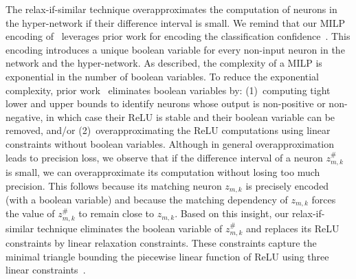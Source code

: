 The relax-if-similar technique overapproximates the computation of neurons in the hyper-network if their difference interval is small. 
We remind that our MILP encoding of~ leverages prior work for encoding the classification confidence~\cite{ref_42}.
This encoding introduces a unique boolean variable for every non-input neuron in the network and the hyper-network.
As described, the complexity of a MILP is exponential in the number of boolean variables. 
 To reduce the exponential complexity, prior work~\cite{ref_49,ref_7,ref_5,ref_6,ref_50} eliminates boolean variables by: 
 (1)~computing tight lower and upper bounds to identify neurons whose output is non-positive or non-negative, in which case their ReLU is stable and their boolean variable can be removed, and/or 
(2)~overapproximating the ReLU computations using linear constraints without boolean variables. 
Although in general overapproximation leads to precision loss, we observe that if the difference interval of a neuron $z_{m,k}^\#$ is small, we can overapproximate its computation without losing too much precision. This follows because its matching neuron $z_{m,k}$ is precisely encoded (with a boolean variable) and because the matching dependency of $z_{m,k}$ forces the value of $z^\#_{m,k}$ to remain close to $z_{m,k}$. 
Based on this insight, our relax-if-similar technique 
eliminates the boolean variable of $z_{m,k}^\#$ and replaces its ReLU constraints by linear relaxation constraints.
These constraints capture the minimal triangle bounding
the piecewise linear function of ReLU 
using three linear constraints~\cite{Ehlers17}. 


